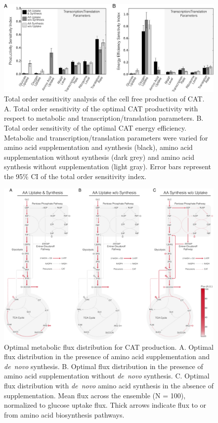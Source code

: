 \documentclass[journal=asbcd6,manuscript=article]{achemso}
\begin{document}
\clearpage

\begin{figure}[t!]
\includegraphics[width=1.00\textwidth]{./figs/Fig-3-Sensitivity-Analysis.pdf}
\caption{Total order sensitivity analysis of the cell free production of CAT.
A. Total order sensitivity of the optimal CAT productivity with respect to metabolic and transcription/translation parameters.
B. Total order sensitivity of the optimal CAT energy efficiency.
Metabolic and transcription/translation parameters were varied for amino acid supplementation and synthesis (black),
amino acid supplementation without synthesis (dark grey) and amino acid synthesis without supplementation (light gray).
Error bars represent the 95\% CI of the total order sensitivity index.}
\label{fig:SI}
\end{figure}

\clearpage

\begin{figure}[t!]
\includegraphics[width=1.00\textwidth]{./figs/Fig-5-FluxDistribition-Optimal.pdf}
\caption{Optimal metabolic flux distribution for CAT production.
A. Optimal flux distribution in the presence of amino acid supplementation and \textit{de~novo} synthesis.
B. Optimal flux distribution in the presence of amino acid supplementation without \textit{de~novo} synthesis.
C. Optimal flux distribution with \textit{de~novo} amino acid synthesis in the absence of supplementation.
Mean flux across the ensemble (N = 100), normalized to glucose uptake flux. Thick arrows indicate flux to or from amino acid biosynthesis pathways.}
\label{fig:flux}
\end{figure}
\end{document}
